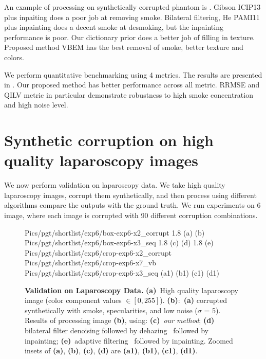 An example of processing on synthetically corrupted phantom is . Gibson ICIP13 \cite{gibson2013wiener} plus inpaiting does a poor job at removing smoke. Bilateral filtering, He PAMI11 \cite{he2011dark} plus inpainting does a decent smoke at desmoking, but the inpainting performance is poor. Our dictionary prior does a better job of filling in texture. Proposed method VBEM has the best removal of smoke, better texture and colors.

We perform quantitative benchmarking using 4 metrics. The results are presented in . Our proposed method has better performance across all metric. RRMSE and QILV metric in particular demonstrate robustness to high smoke concentration and high noise level.

\section{Synthetic corruption on high quality laparoscopy images}
We now perform validation on laparoscopy data. We take high quality laparoscopy images, corrupt them synthetically, and then process using different algorithms compare the outputs with the ground truth. We run experiments on 6 image, where each image is corrupted with 90 different corruption combinations.

\begin{figure}[!h]
     {Pics/pgt/shortlist/exp6/box-exp6-x2_corrupt} {1.8} {(a)} {(b)}
     {Pics/pgt/shortlist/exp6/box-exp6-x3_seq} {1.8} {(c)} {(d)}
     {1.8} {(e)}
     {Pics/pgt/shortlist/exp6/crop-exp6-x2_corrupt} {Pics/pgt/shortlist/exp6/crop-exp6-x7_vb} {Pics/pgt/shortlist/exp6/crop-exp6-x3_seq}  {(a1)} {(b1)} {(c1)} {(d1)}
    \caption
    {
        {\bf Validation on Laparoscopy Data. }
        {\bf (a)}~High quality laparoscopy image (color component values $\in [0,255]$).
        {\bf (b)}:~{\bf (a)} corrupted synthetically with smoke, specularities, and low noise ($\sigma$ = 5).
        Results of processing image {\bf (b)}, using:
        {\bf (c)}~{\em our method};
        {\bf (d)}~ bilateral filter denoising followed by dehazing~\cite{he2011dark} followed by inpainting;
        {\bf (e)}~adaptive filtering~\cite{gibson2013wiener} followed by inpainting.
        Zoomed insets of {\bf (a)}, {\bf (b)}, {\bf (c)}, {\bf (d)} are {\bf (a1)}, {\bf (b1)}, {\bf (c1)}, {\bf (d1)}.
    }
    \label{fig:imagesPgt1}
\end{figure}

